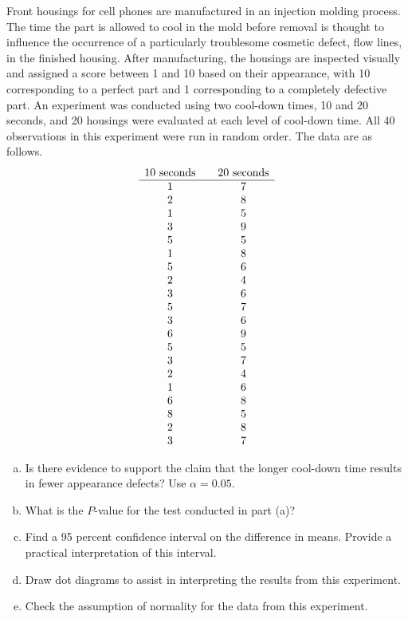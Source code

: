 \documentclass[answers,12pt,addpoints]{exam}
\begin{document}
\begin{questions}
\begin{solution}
\end{solution}


Front housings for cell phones are manufactured in an injection molding process. The time the part is allowed to cool in the mold before removal is thought to influence the occurrence of a particularly troublesome cosmetic defect, flow lines, in the finished housing. After manufacturing, the housings are inspected visually and assigned a score between 1 and 10 based on their appearance, with 10 corresponding to a perfect part and 1 corresponding to a completely defective part. An experiment was conducted using two cool-down times, 10 and 20 seconds, and 20 housings were evaluated at each level of cool-down time. All 40 observations in this experiment were run in random order. The data are as follows.
\[
\begin{array}{c@{\qquad}c}
\text{10 seconds} & \text{20 seconds} \\
\hline
1 & 7 \\
2 & 8 \\
1 & 5 \\
3 & 9 \\
5 & 5 \\
1 & 8 \\
5 & 6 \\
2 & 4 \\
3 & 6 \\
5 & 7 \\
3 & 6 \\
6 & 9 \\
5 & 5 \\
3 & 7 \\
2 & 4 \\
1 & 6 \\
6 & 8 \\
8 & 5 \\
2 & 8 \\
3 & 7
\end{array}
\]

\begin{enumerate}[(a)]
\item Is there evidence to support the claim that the longer cool-down time results in fewer appearance defects? Use $\alpha = 0.05$.
\item What is the $P$-value for the test conducted in part (a)?
\item Find a 95 percent confidence interval on the difference in means. Provide a practical interpretation of this interval.
\item Draw dot diagrams to assist in interpreting the results from this experiment.
\item Check the assumption of normality for the data from this experiment.
\end{enumerate}


\end{questions}
\end{document}
